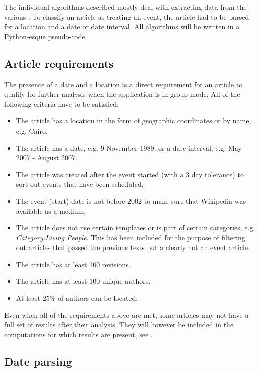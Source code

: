 The individual algorithms described mostly deal with extracting data from the various .
To classify an article as treating an event, the article had to be parsed for a location and a date or date interval.
All algorithms will be written in a Python-esque pseudo-code.

\subsection{Article requirements}\label{sub:articlerequirements}

The presence of a date and a location is a direct requirement for an article to qualify for further analysis when the application is in group mode.
All of the following criteria have to be satisfied:

\begin{itemize}
  \item The article has a location in the form of geographic coordinates or by name, e.g. Cairo.
  \item The article has a date, e.g. 9 November 1989, or a date interval, e.g. May 2007 - August 2007.
  \item The article was created after the event started (with a 3 day tolerance) to sort out events that have been scheduled.
  \item The event (start) date is not before 2002 to make sure that Wikipedia was available as a medium. 
  \item The article does not use certain templates or is part of certain categories, e.g. \emph{Category:Living People}.
  This has been included for the purpose of filtering out articles that passed the previous tests but a clearly not an event article. 
  \item The article has at least 100 revisions.
  \item The article has at least 100 unique authors.
  \item At least 25\% of authors can be located.
\end{itemize}

Even when all of the requirements above are met, some articles may not have a full set of results after their analysis.
They will however be included in the computations for which results are present, see .

\subsection{Date parsing}

